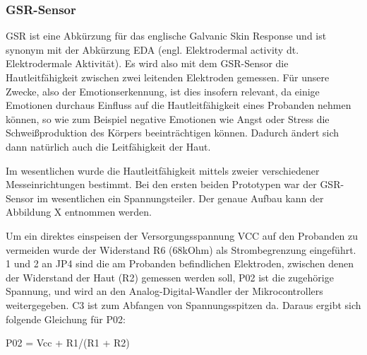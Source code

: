 \subsubsection{GSR-Sensor} \label{gsr-1}

GSR ist eine Abkürzung für das englische Galvanic Skin Response und ist synonym mit der Abkürzung EDA (engl. Elektrodermal activity dt. Elektrodermale Aktivität). Es wird also mit dem GSR-Sensor die Hautleitfähigkeit zwischen zwei leitenden Elektroden gemessen. Für unsere Zwecke, also der Emotionserkennung, ist dies insofern relevant, da einige Emotionen durchaus Einfluss auf die Hautleitfähigkeit eines Probanden nehmen können, so wie zum Beispiel negative Emotionen wie Angst oder Stress die Schweißproduktion des Körpers beeinträchtigen können. Dadurch ändert sich dann natürlich auch die Leitfähigkeit der Haut.

Im wesentlichen wurde die Hautleitfähigkeit mittels zweier verschiedener Messeinrichtungen bestimmt. Bei den ersten beiden Prototypen war der GSR-Sensor im wesentlichen ein Spannungsteiler. Der genaue Aufbau kann der Abbildung X entnommen werden. 


Um ein direktes einspeisen der Versorgungsspannung VCC auf den Probanden zu vermeiden wurde der Widerstand R6 (68kOhm) als Strombegrenzung eingeführt. 1 und 2 an JP4 sind die am Probanden befindlichen Elektroden, zwischen denen der Widerstand der Haut (R2) gemessen werden soll, P02 ist die zugehörige Spannung, und wird an den Analog-Digital-Wandler der Mikrocontrollers weitergegeben. C3 ist zum Abfangen von Spannungsspitzen da. Daraus ergibt sich folgende Gleichung für P02:

P02 = Vcc + R1/(R1 + R2)  %

